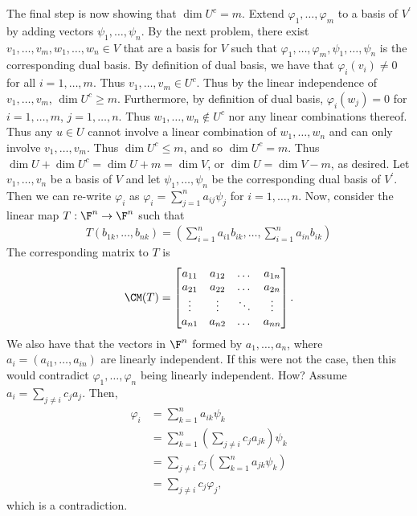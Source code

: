 \documentclass{book}
\begin{document}
\begin{enumerate}[label=\arabic*)]
      The final step is now showing that $\dim{U^c} = m$. Extend $\varphi_1, \dots, \varphi_m$ to a basis of $V^{\prime}$ by adding vectors $\psi_1, \dots, \psi_n$. By the next problem,
      there exist $v_1, \dots, v_m, w_1, \dots, w_n \in V$ that are a basis for $V$ such that $\varphi_1, \dots, \varphi_m, \psi_1, \dots, \psi_n$ is the corresponding dual basis. By
      definition of dual basis, we have that $\varphi_i(v_i) \neq 0$ for all $i = 1, \dots, m$. Thus $v_1, \dots, v_m \in U^c$. Thus by the linear independence of $v_1, \dots, v_m$,
      $\dim{U^c} \geq m$. Furthermore, by definition of dual basis, $\varphi_i(w_j) = 0$ for $i = 1, \dots, m$, $j = 1, \dots, n$. Thus $w_1, \dots, w_n \not\in U^c$ nor any linear
      combinations thereof. Thus any $u \in U$ cannot involve a linear combination of $w_1, \dots, w_n$ and can only involve $v_1, \dots, v_m$. Thus $\dim{U^c} \leq m$, and so $\dim{U^c} =
      m$. Thus $\dim{U} + \dim{U^c} = \dim{U} + m = \dim{V}$, or $\dim{U} = \dim{V} - m$, as desired.
    \ii
      Let $v_1, \dots, v_n$ be a basis of $V$ and let $\psi_1, \dots, \psi_n$ be the corresponding dual basis of $V^{\prime}$. Then we can re-write $\varphi_i$ as $\varphi_i = \sum_{j =
      1}^{n}a_{ij}\psi_j$ for $i = 1, \dots, n$. Now, consider the linear map $T: \F^n \to \F^n$ such that 
      \begin{align*}
        T(b_{1k}, \dots, b_{nk}) = (\sum_{i = 1}^{n}a_{i1}b_{ik}, \dots, \sum_{i = 1}^{n}a_{in}b_{ik}) 
      \end{align*}
      The corresponding matrix to $T$ is
      \begin{align*}
        \CM(T) = \begin{bmatrix}
          a_{11} & a_{12} & \dots & a_{1n} \\
          a_{21} & a_{22} & \dots & a_{2n} \\
          \vdots & \vdots & \ddots & \vdots \\
          a_{n1} & a_{n2} & \dots & a_{nn}
        \end{bmatrix}.
      \end{align*}
      We also have that the vectors in $\F^n$ formed by $a_1, \dots, a_n$, where $a_i = (a_{i1}, \dots, a_{in})$ are linearly independent. If this were not the case, then this would
      contradict $\varphi_1, \dots,\varphi_n$ being linearly independent. How? Assume $a_i = \sum_{j \neq i}c_ja_j$. Then, 
      \begin{align*}
        \varphi_i & = \sum_{k = 1}^{n}a_{ik}\psi_k \\
        & = \sum_{k = 1}^{n}(\sum_{j \neq i}c_ja_{jk})\psi_k \\
        & = \sum_{j \neq i}c_j(\sum_{k = 1}^{n}a_{jk}\psi_k) \\
        & = \sum_{j \neq i}c_j\varphi_j,
      \end{align*}
      which is a contradiction.


\end{enumerate}
\end{document}
